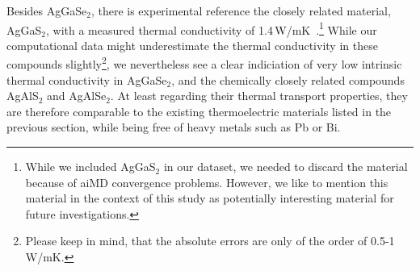 Besides AgGaSe$_2$, there is experimental reference the closely related material, AgGaS$_2$, with a measured thermal conductivity of 1.4\,W/mK~\cite{beasley1994}.\footnote{While we included AgGaS$_2$ in our dataset, we needed to discard the material because of aiMD convergence problems. However, we like to mention this material in the context of this study as potentially interesting material for future investigations.} While our computational data might underestimate the thermal conductivity in these compounds slightly\footnote{Please keep in mind, that the absolute errors are only of the order of 0.5-1\,W/mK.}, we nevertheless see a clear indiciation of very low intrinsic thermal conductivity in AgGaSe$_2$, and the chemically closely related compounds AgAlS$_2$ and AgAlSe$_2$. At least regarding their thermal transport properties, they are therefore comparable to the existing thermoelectric materials listed in the previous section, while being free of heavy metals such as Pb or Bi.

